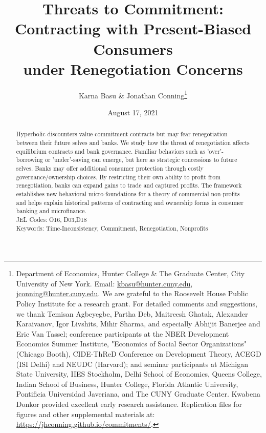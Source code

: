\documentclass[11pt,english]{article}
\date{August 17, 2021}\usepackage{babel}
\theoremstyle{plain}
\theoremstyle{definition}
\begin{document}

\title{Threats to Commitment:\\Contracting with Present-Biased Consumers\\under Renegotiation Concerns}

\author{Karna Basu \& Jonathan Conning\thanks{Department of Economics, Hunter College \& The Graduate Center, City
University of New York. Email: \href{mailto:kbasu@hunter.cuny.edu}{kbasu@hunter.cuny.edu}, \href{mailto:jconning@hunter.cuny.edu}{jconning@hunter.cuny.edu}.
We are grateful to the Roosevelt House Public Policy Institute for a research grant. For detailed
comments and suggestions, we thank Temisan Agbeyegbe, Partha Deb, Maitreesh Ghatak, Alexander Karaivanov, Igor Livshits, Mihir Sharma, and especially Abhijit Banerjee and Eric Van Tassel; conference participants at the NBER Development
Economics Summer Institute, "Economics of Social Sector Organizations"
(Chicago Booth), CIDE-ThReD Conference on Development Theory, ACEGD
(ISI Delhi) and NEUDC (Harvard); and seminar participants
at Michigan State University, IIES Stockholm, Delhi School of Economics,
Queens College, Indian School of Business, Hunter College, Florida
Atlantic University, Pontificia Universidad Javeriana, and The CUNY Graduate
Center. Kwabena Donkor provided excellent early research assistance. Replication files for figures and other supplemental materials at:
\protect\url{https://jhconning.github.io/commitments/}.}}



\maketitle

\begin{abstract}
Hyperbolic discounters value commitment contracts but may fear renegotiation between their future selves and banks. We study how the threat of renegotiation affects equilibrium contracts and bank governance. Familiar behaviors such as 'over'-borrowing or 'under'-saving can emerge, but here as strategic concessions to future selves. Banks may offer additional consumer protection through costly governance/ownership choices. By restricting their own ability to profit from renegotiation, banks can expand gains to trade and captured profits. The framework establishes new behavioral micro-foundations for a theory of commercial non-profits and helps explain historical patterns of contracting and ownership forms in consumer banking and microfinance.  
\\JEL Codes: O16, D03,D18 
\\Keywords: Time-Inconsistency, Commitment, Renegotiation, Nonprofits
\end{abstract}
\vspace{\baselineskip}
\end{document}
